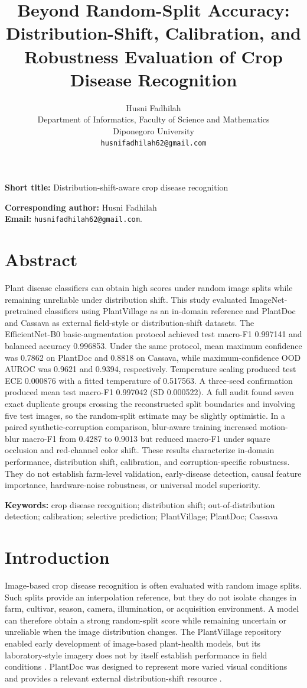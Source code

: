 \documentclass[12pt]{article}
\title{Beyond Random-Split Accuracy: Distribution-Shift, Calibration, and Robustness Evaluation of Crop Disease Recognition}
\author{\small Husni Fadhilah\\Department of Informatics, Faculty of Science and Mathematics\\Diponegoro University\\\texttt{husnifadhilah62@\allowbreak gmail.com}}
\date{}
\begin{document}
\maketitle
\thispagestyle{plain}
\textbf{Short title:} Distribution-shift-aware crop disease recognition

\textbf{Corresponding author:} Husni Fadhilah\\
\textbf{Email:} \texttt{husnifadhilah62@\allowbreak gmail.com}.

\section*{Abstract}
Plant disease classifiers can obtain high scores under random image splits while remaining unreliable under distribution shift. This study evaluated ImageNet-pretrained classifiers using PlantVillage as an in-domain reference and PlantDoc and Cassava as external field-style or distribution-shift datasets. The EfficientNet-B0 basic-augmentation protocol achieved test macro-F1 0.997141 and balanced accuracy 0.996853. Under the same protocol, mean maximum confidence was 0.7862 on PlantDoc and 0.8818 on Cassava, while maximum-confidence OOD AUROC was 0.9621 and 0.9394, respectively. Temperature scaling produced test ECE 0.000876 with a fitted temperature of 0.517563. A three-seed confirmation produced mean test macro-F1 0.997042 (SD 0.000522). A full audit found seven exact duplicate groups crossing the reconstructed split boundaries and involving five test images, so the random-split estimate may be slightly optimistic. In a paired synthetic-corruption comparison, blur-aware training increased motion-blur macro-F1 from 0.4287 to 0.9013 but reduced macro-F1 under square occlusion and red-channel color shift. These results characterize in-domain performance, distribution shift, calibration, and corruption-specific robustness. They do not establish farm-level validation, early-disease detection, causal feature importance, hardware-noise robustness, or universal model superiority.

\textbf{Keywords:} crop disease recognition; distribution shift; out-of-distribution detection; calibration; selective prediction; PlantVillage; PlantDoc; Cassava

\section{Introduction}
Image-based crop disease recognition is often evaluated with random image splits. Such splits provide an interpolation reference, but they do not isolate changes in farm, cultivar, season, camera, illumination, or acquisition environment. A model can therefore obtain a strong random-split score while remaining uncertain or unreliable when the image distribution changes. The PlantVillage repository enabled early development of image-based plant-health models, but its laboratory-style imagery does not by itself establish performance in field conditions \citep{hughes2015}. PlantDoc was designed to represent more varied visual conditions and provides a relevant external distribution-shift resource \citep{singh2020}.
\end{document}
